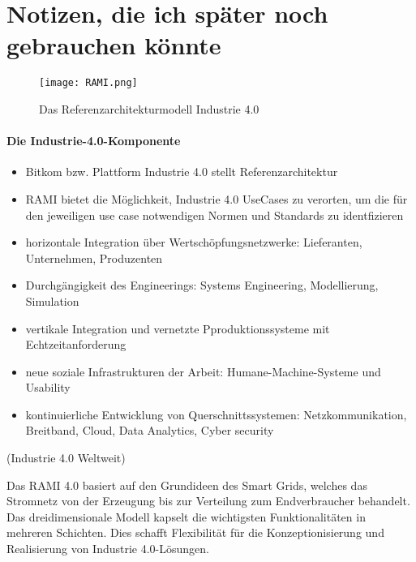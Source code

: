 
\section{Notizen, die ich später noch gebrauchen könnte}


\begin{figure}[h]
  \texttt{[image: RAMI.png]}
  \caption[Das Referenzarchitekturmodell Industrie 4.0]{Das Referenzarchitekturmodell Industrie 4.0 \citep{BITKOM2015}}
  \label{fig:rami}
\end{figure}

\paragraph{Die Industrie-4.0-Komponente}


\begin{itemize}
  \item Bitkom bzw. Plattform Industrie 4.0 stellt Referenzarchitektur
  \item RAMI bietet die Möglichkeit, Industrie 4.0 UseCases zu verorten, um die für den jeweiligen use case notwendigen Normen und Standards zu identfizieren
  \item horizontale Integration über Wertschöpfungsnetzwerke: Lieferanten, Unternehmen, Produzenten
  \item Durchgängigkeit des Engineerings: Systems Engineering, Modellierung, Simulation
  \item vertikale Integration und vernetzte Pproduktionssysteme mit Echtzeitanforderung
  \item neue soziale Infrastrukturen der Arbeit: Humane-Machine-Systeme und Usability
  \item kontinuierliche Entwicklung von Querschnittssystemen: Netzkommunikation, Breitband, Cloud, Data Analytics, Cyber security
\end{itemize}

(Industrie 4.0 Weltweit)

Das RAMI 4.0 basiert auf den Grundideen des Smart Grids, welches das Stromnetz von der Erzeugung bis zur Verteilung zum Endverbraucher behandelt. Das dreidimensionale Modell kapselt die wichtigsten Funktionalitäten in mehreren Schichten. Dies schafft Flexibilität für die Konzeptionisierung und Realisierung von Industrie 4.0-Lösungen.

